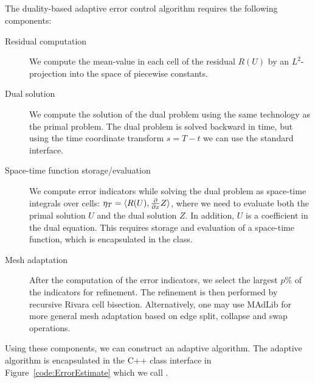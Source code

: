 \subsection{}

The duality-based adaptive error control algorithm requires the
following components:

\begin{description}
\item[Residual computation] We compute the mean-value in each cell of
  the residual $R(U)$ by an $L^2$-projection into the space of piecewise
  constants.
\item[Dual solution] We compute the solution of the dual problem using
  the same technology as the primal problem. The dual problem is
  solved backward in time, but using the time coordinate transform $s =
  T - t$ we can use the standard  interface.
\item[Space-time function storage/evaluation] We compute error
  indicators while solving the dual problem as space-time integrals
  over cells: $\eta_T = \langle R(U), \frac{\partial}{\partial x} Z \rangle$, where
  we need to evaluate both the primal solution $U$ and the dual
  solution $Z$. In addition, $U$ is a coefficient in the dual
  equation. This requires storage and evaluation of a space-time
  function, which is encapsulated in the 
  class.
\item[Mesh adaptation] After the computation of the error indicators,
  we select the largest $p\%$ of the indicators for refinement. The
  refinement is then performed by recursive Rivara cell bisection.
  Alternatively, one may use MAdLib
  \citep{Comp`ereRemacleJanssonEtAl2009} for more general mesh
  adaptation based on edge split, collapse and swap operations.
\end{description}

Using these components, we can construct an adaptive algorithm. The
adaptive algorithm is encapsulated in the C++ class interface in
Figure~\ref{code:ErrorEstimate} which we call .

